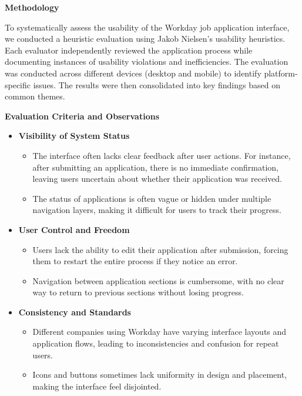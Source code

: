 \documentclass[
	letterpaper, %
]{jdf}
\begin{document}
\begin{sloppypar}
\textbf{Methodology}  

To systematically assess the usability of the Workday job application interface, we conducted a heuristic evaluation using Jakob Nielsen’s usability heuristics. Each evaluator independently reviewed the application process while documenting instances of usability violations and inefficiencies. The evaluation was conducted across different devices (desktop and mobile) to identify platform-specific issues. The results were then consolidated into key findings based on common themes.  

\textbf{Evaluation Criteria and Observations}  

\begin{itemize}
    \item \textbf{Visibility of System Status}  
    \begin{itemize}
        \item The interface often lacks clear feedback after user actions. For instance, after submitting an application, there is no immediate confirmation, leaving users uncertain about whether their application was received.
        \item The status of applications is often vague or hidden under multiple navigation layers, making it difficult for users to track their progress.
    \end{itemize}

    \item \textbf{User Control and Freedom}  
    \begin{itemize}
        \item Users lack the ability to edit their application after submission, forcing them to restart the entire process if they notice an error.
        \item Navigation between application sections is cumbersome, with no clear way to return to previous sections without losing progress.
    \end{itemize}

    \item \textbf{Consistency and Standards}  
    \begin{itemize}
        \item Different companies using Workday have varying interface layouts and application flows, leading to inconsistencies and confusion for repeat users.
        \item Icons and buttons sometimes lack uniformity in design and placement, making the interface feel disjointed.
    \end{itemize}


\end{itemize}
\end{sloppypar}
\end{document}
